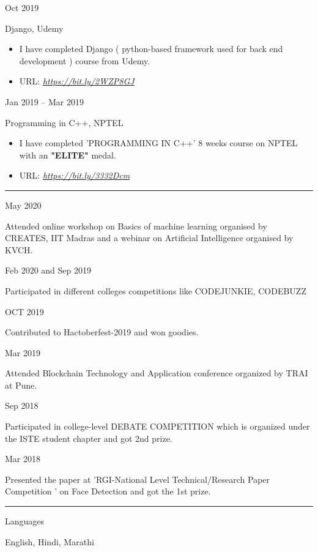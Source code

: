\documentclass[a4paper,10pt]{article}
\newlength{\cvcolumngapwidth}
\newlength{\cvleftcolumnwidth}
\newlength{\cvrightcolumnwidth}
\newcommand{\cvsectionstyle}[1]{{\normalsize\cvsectionfont\textcolor{cvsectioncolor}{#1}}}
\newcommand{\cvtitlestyle}[1]{{\large\cvtitlefont\textcolor{cvtitlecolor}{#1}}}
\newcommand{\cvdurationstyle}[1]{{\small\cvdurationfont\textcolor{cvdurationcolor}{#1}}}
\newcommand{\cvheadingstyle}[1]{{\normalsize\cvheadingfont\textcolor{cvheadingcolor}{#1}}}
\newlength{\cvafteritemskipamount}
\newlength{\cvaftersectionskipamount}
\newlength{\cvbetweensectionandheadingextraskipamount}
\newlength{\cvaftertitleskipamount}
\newlength{\cvparskip}
\newcommand{\cvsection}[1]{
    \begin{minipage}[t]{\cvleftcolumnwidth}
        \raggedleft\cvsectionstyle{#1}
    \end{minipage}%
    \hspace{\cvcolumngapwidth}%
    \begin{minipage}[t]{\cvrightcolumnwidth}
        \textcolor{cvrulecolor}{\rule{\cvrightcolumnwidth}{0.3mm}}
    \end{minipage}

    \vspace{\cvaftersectionskipamount}
}
\newcommand{\cvitem}[2]{
    \begin{minipage}[t]{\cvleftcolumnwidth}
        \raggedleft #1
    \end{minipage}%
    \hspace{\cvcolumngapwidth}%
    \begin{minipage}[t]{\cvrightcolumnwidth}
        \setlength{\parskip}{\cvparskip} #2
    \end{minipage}

    \vspace{\cvafteritemskipamount}
}
\newcommand{\cvtitle}[1]{
    \cvtitlestyle{#1}

    \vspace{\cvaftertitleskipamount}
    \vspace{-\cvparskip}
}
\begin{document}
\cvitem{
    \cvdurationstyle{Oct 2019}
}{
    \cvtitle{Django, Udemy}


    \begin{itemize}[leftmargin=*]
         \item I have completed Django ( python-based framework
used for back end development ) course from Udemy.
        \item URL:
        \textit{\href{https://www.udemy.com/certificate/UC-IOQDAJNX/}{https://bit.ly/2WZP8GJ}}
        
    \end{itemize}
}






\cvitem{
    \cvdurationstyle{Jan 2019 -- Mar 2019}
}{
    \cvtitle{Programming in C++, NPTEL}


    \begin{itemize}[leftmargin=*]
         \item I have completed 'PROGRAMMING IN C++' 8 weeks
course on NPTEL with an \textbf{"ELITE"} medal.
        \item URL:
        \textit{\href{https://nptel.ac.in/noc/Ecertificate/?q=noc19-cs10/NPTEL19CS10S21740556191063293.jpg}{https://bit.ly/3332Dcm}}
        
    \end{itemize}
}









\cvsection{EXTRA CURRICULUM ACTIVITIES}

\vspace{\cvbetweensectionandheadingextraskipamount}

\cvitem{
    \cvheadingstyle{May 2020}
}{
    Attended online workshop on Basics of machine learning organised by CREATES, IIT Madras and a webinar on Artificial Intelligence organised by KVCH.
}



\cvitem{
    \cvheadingstyle{Feb 2020 and Sep 2019}
}{
   Participated in different colleges competitions like CODEJUNKIE, CODEBUZZ
}

\cvitem{
    \cvheadingstyle{OCT 2019}
}{
  Contributed to Hactoberfest-2019 and won goodies.
}


\cvitem{
    \cvheadingstyle{Mar 2019}
}{
  Attended Blockchain Technology and Application conference organized by TRAI at Pune.
}

\cvitem{
    \cvheadingstyle{Sep 2018}
}{
    Participated in college-level DEBATE COMPETITION which is organized under the ISTE student chapter and got 2nd prize.
}

\cvitem{
    \cvheadingstyle{Mar 2018}
}{
    Presented the paper at ’RGI-National Level Technical/Research Paper Competition ’ on Face Detection and got the 1st prize.
}

\cvsection{PERSONAL DETAILS}

\cvitem{
    \cvheadingstyle{Languages}
}{
    \item English, Hindi, Marathi
}
\end{document}
